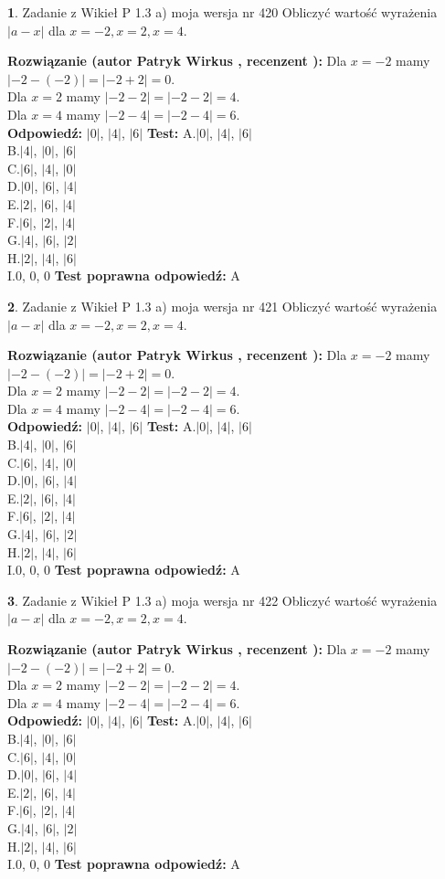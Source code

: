 \documentclass[12pt, a4paper]{article}
\theoremstyle{definition} %
\newtheorem{zad}{}
\newcommand{\zadStart}[1]{\begin{zad}#1\newline}
\newcommand{\zadStop}{\end{zad}}
\newcommand{\rozwStart}[2]{\noindent \textbf{Rozwiązanie (autor #1 , recenzent #2): }\newline}
\newcommand{\rozwStop}{\newline}
\newcommand{\odpStart}{\noindent \textbf{Odpowiedź:}\newline}
\newcommand{\odpStop}{\newline}
\newcommand{\testStart}{\noindent \textbf{Test:}\newline}
\newcommand{\testStop}{\newline}
\newcommand{\kluczStart}{\noindent \textbf{Test poprawna odpowiedź:}\newline}
\newcommand{\kluczStop}{\newline}
\begin{document}
\zadStart{Zadanie z Wikieł P 1.3 a) moja wersja nr 420}
Obliczyć wartość wyrażenia $|a - x|$ dla $x=-2,x=2,x=4$.
\zadStop
\rozwStart{Patryk Wirkus}{}
Dla $x = -2$ mamy $|-2 - (-2)| = |-2 + 2| = 0$.\\
Dla $x = 2$ mamy $|-2 - 2| = |-2 - 2| = 4$.\\
Dla $x = 4$ mamy $|-2 - 4| = |-2 - 4| = 6$.\\
\rozwStop
\odpStart
$|0|$, $|4|$, $|6|$
\odpStop
\testStart
A.$|0|$, $|4|$, $|6|$\\
B.$|4|$, $|0|$, $|6|$\\
C.$|6|$, $|4|$, $|0|$\\
D.$|0|$, $|6|$, $|4|$\\
E.$|2|$, $|6|$, $|4|$\\
F.$|6|$, $|2|$, $|4|$\\
G.$|4|$, $|6|$, $|2|$\\
H.$|2|$, $|4|$, $|6|$\\
I.$0$, $0$, $0$
\testStop
\kluczStart
A
\kluczStop



\zadStart{Zadanie z Wikieł P 1.3 a) moja wersja nr 421}
Obliczyć wartość wyrażenia $|a - x|$ dla $x=-2,x=2,x=4$.
\zadStop
\rozwStart{Patryk Wirkus}{}
Dla $x = -2$ mamy $|-2 - (-2)| = |-2 + 2| = 0$.\\
Dla $x = 2$ mamy $|-2 - 2| = |-2 - 2| = 4$.\\
Dla $x = 4$ mamy $|-2 - 4| = |-2 - 4| = 6$.\\
\rozwStop
\odpStart
$|0|$, $|4|$, $|6|$
\odpStop
\testStart
A.$|0|$, $|4|$, $|6|$\\
B.$|4|$, $|0|$, $|6|$\\
C.$|6|$, $|4|$, $|0|$\\
D.$|0|$, $|6|$, $|4|$\\
E.$|2|$, $|6|$, $|4|$\\
F.$|6|$, $|2|$, $|4|$\\
G.$|4|$, $|6|$, $|2|$\\
H.$|2|$, $|4|$, $|6|$\\
I.$0$, $0$, $0$
\testStop
\kluczStart
A
\kluczStop



\zadStart{Zadanie z Wikieł P 1.3 a) moja wersja nr 422}
Obliczyć wartość wyrażenia $|a - x|$ dla $x=-2,x=2,x=4$.
\zadStop
\rozwStart{Patryk Wirkus}{}
Dla $x = -2$ mamy $|-2 - (-2)| = |-2 + 2| = 0$.\\
Dla $x = 2$ mamy $|-2 - 2| = |-2 - 2| = 4$.\\
Dla $x = 4$ mamy $|-2 - 4| = |-2 - 4| = 6$.\\
\rozwStop
\odpStart
$|0|$, $|4|$, $|6|$
\odpStop
\testStart
A.$|0|$, $|4|$, $|6|$\\
B.$|4|$, $|0|$, $|6|$\\
C.$|6|$, $|4|$, $|0|$\\
D.$|0|$, $|6|$, $|4|$\\
E.$|2|$, $|6|$, $|4|$\\
F.$|6|$, $|2|$, $|4|$\\
G.$|4|$, $|6|$, $|2|$\\
H.$|2|$, $|4|$, $|6|$\\
I.$0$, $0$, $0$
\testStop
\kluczStart
A
\kluczStop
\end{document}

